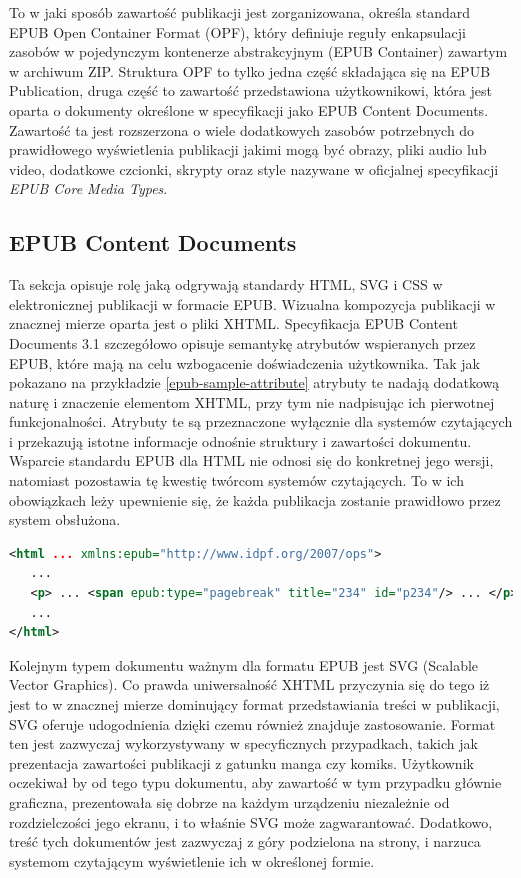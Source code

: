 To w jaki sposób zawartość publikacji jest zorganizowana, określa standard EPUB Open Container Format (OPF), który definiuje reguły enkapsulacji zasobów w pojedynczym kontenerze abstrakcyjnym (EPUB Container) zawartym w archiwum ZIP. Struktura OPF to tylko jedna część składająca się na EPUB Publication, druga część to zawartość przedstawiona użytkownikowi, która jest oparta o dokumenty określone w specyfikacji jako EPUB Content Documents. Zawartość ta jest rozszerzona o wiele dodatkowych zasobów potrzebnych do prawidłowego wyświetlenia publikacji jakimi mogą być obrazy, pliki audio lub video, dodatkowe czcionki, skrypty oraz style nazywane w oficjalnej specyfikacji \textit{EPUB Core Media Types}.

\subsection{EPUB Content Documents}

Ta sekcja opisuje rolę jaką odgrywają standardy HTML, SVG i CSS w elektronicznej publikacji w formacie EPUB. Wizualna kompozycja publikacji w znacznej mierze oparta jest o pliki XHTML. Specyfikacja EPUB Content Documents 3.1 szczegółowo opisuje semantykę atrybutów wspieranych przez EPUB, które mają na celu wzbogacenie doświadczenia użytkownika. Tak jak pokazano na przykładzie \ref{epub-sample-attribute} atrybuty te nadają dodatkową naturę i znaczenie elementom XHTML, przy tym nie nadpisując ich pierwotnej funkcjonalności. Atrybuty te są przeznaczone wyłącznie dla systemów czytających i przekazują istotne informacje odnośnie struktury i zawartości dokumentu. Wsparcie standardu EPUB dla HTML nie odnosi się do konkretnej jego wersji, natomiast pozostawia tę kwestię twórcom systemów czytających. To w ich obowiązkach leży upewnienie się, że każda publikacja zostanie prawidłowo przez system obsłużona.

\begin{lstlisting}[float=h, caption={Przykładowe wykorzystanie atrybutu epub:type aby oznaczyć zakończenie linii.\protect\cite{EPUBContentDocumentsSpecificationXML}}, language=XML, label=epub-sample-attribute]
<html ... xmlns:epub="http://www.idpf.org/2007/ops">
   ...
   <p> ... <span epub:type="pagebreak" title="234" id="p234"/> ... </p>
   ...
</html>
\end{lstlisting}

Kolejnym typem dokumentu ważnym dla formatu EPUB jest SVG (Scalable Vector Graphics). Co prawda uniwersalność XHTML przyczynia się do tego iż jest to w znacznej mierze dominujący format przedstawiania treści w publikacji, SVG oferuje udogodnienia dzięki czemu również znajduje zastosowanie. Format ten jest zazwyczaj wykorzystywany w specyficznych przypadkach, takich jak prezentacja zawartości publikacji z gatunku manga czy komiks. Użytkownik oczekiwał by od tego typu dokumentu, aby zawartość w tym przypadku głównie graficzna, prezentowała się dobrze na każdym urządzeniu niezależnie od rozdzielczości jego ekranu, i to właśnie SVG może zagwarantować. Dodatkowo, treść tych dokumentów jest zazwyczaj z góry podzielona na strony, i narzuca systemom czytającym wyświetlenie ich w określonej formie.

